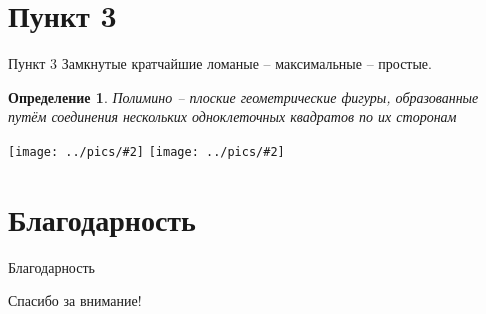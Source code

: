 \documentclass[serif, ucs]{beamer}
\newtheorem{Def}{Определение}[section]
\newcommand{\gr}[2]{\texttt{[image: ../pics/\#2]}}
\begin{document}
\section{Пункт 3}
\begin{frame}{Пункт 3}
	Замкнутые кратчайшие ломаные -- максимальные -- простые.
	
	\begin{Def}
	Полимино -- плоские геометрические фигуры, образованные путём соединения нескольких одноклеточных квадратов по их сторонам
\end{Def}

\gr{0.4}{babaBaBAAA}
\gr{0.4}{bbbaBBaBAA}
\end{frame}
\section{Благодарность}
\begin{frame}{Благодарность}
\begin{center}
{\LARGE Спасибо за внимание!}
\end{center}
\end{frame}
\end{document}
